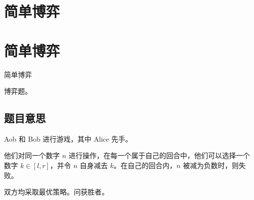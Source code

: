 \def\sectionName{简单博弈}



\isBeamerMode\relax
    \section[\TOCName]{\sectionName}
\fi
\isBeamerMode\relax
    \section[\TOCName\ -\ \sectionName]{\sectionName}
\fi

\begin{frame}

\isBeamerMode\relax
    {\Huge \sectionName}\par
\fi




博弈题。



\end{frame}

\subsection{题目意思}
\begin{frame} %
Aob 和 Bob 进行游戏，其中 Alice 先手。

他们对同一个数字 $n$ 进行操作，在每一个属于自己的回合中，他们可以选择一个数字 $k
\in [l, r]$，并令 $n$ 自身减去 $k$。在自己的回合内，$n$ 被减为负数时，则失败。

双方均采取最优策略。问获胜者。
\end{frame}



